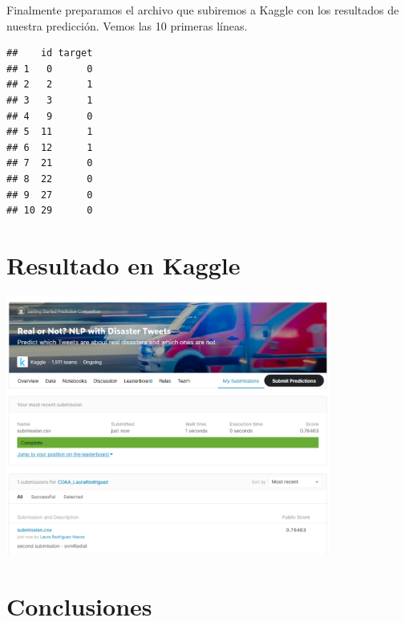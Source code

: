 \documentclass[]{article}
\newenvironment{Shaded}{\begin{snugshade}}{\end{snugshade}}
\newcommand{\DataTypeTok}[1]{\textcolor[rgb]{0.13,0.29,0.53}{#1}}
\newcommand{\DecValTok}[1]{\textcolor[rgb]{0.00,0.00,0.81}{#1}}
\newcommand{\KeywordTok}[1]{\textcolor[rgb]{0.13,0.29,0.53}{\textbf{#1}}}
\newcommand{\NormalTok}[1]{#1}
\newcommand{\OperatorTok}[1]{\textcolor[rgb]{0.81,0.36,0.00}{\textbf{#1}}}
\newcommand{\OtherTok}[1]{\textcolor[rgb]{0.56,0.35,0.01}{#1}}
\newcommand{\StringTok}[1]{\textcolor[rgb]{0.31,0.60,0.02}{#1}}
\begin{document}
Finalmente preparamos el archivo que subiremos a Kaggle con los
resultados de nuestra predicción. Vemos las 10 primeras líneas.

\begin{Shaded}
\end{Shaded}

\begin{verbatim}
##    id target
## 1   0      0
## 2   2      1
## 3   3      1
## 4   9      0
## 5  11      1
## 6  12      1
## 7  21      0
## 8  22      0
## 9  27      0
## 10 29      0
\end{verbatim}

\hypertarget{resultado-en-kaggle}{%
\section{Resultado en Kaggle}\label{resultado-en-kaggle}}

\includegraphics[width=0.8\textwidth,height=\textheight]{submission.png}

\hypertarget{conclusiones}{%
\section{Conclusiones}\label{conclusiones}}
\end{document}
